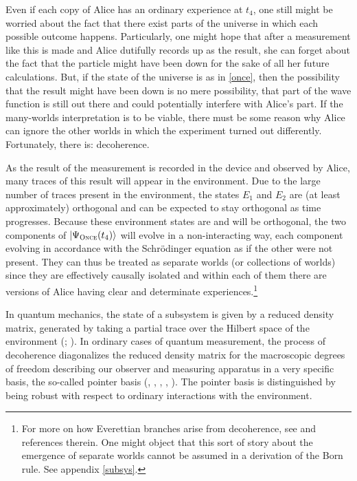 \documentclass[onecolumn,secnumarabic,amsmath,amssymb,balancelastpage,nofootinbib]{article}
\newcommand{\ket}[1]{\ensuremath{\left|#1\right\rangle}}
\begin{document}
Even if each copy of Alice has an ordinary experience at $t_4$, one still might be worried about the fact that there exist parts of the universe in which each possible outcome happens.  Particularly, one might hope that after a measurement like this is made and Alice dutifully records up as the result, she can forget about the fact that the particle might have been down for the sake of all her future calculations.  But, if the state of the universe is as in \eqref{once}, then the possibility that the result might have been down is no mere possibility, that part of the wave function is still out there and could potentially interfere with Alice's part.  If the many-worlds interpretation is to be viable, there must be some reason why Alice can ignore the other worlds in which the experiment turned out differently.  Fortunately, there is: decoherence.

As the result of the measurement is recorded in the device and observed by Alice, many traces of this result will appear in the environment.  Due to the large number of traces present in the environment, the states $E_1$ and $E_2$ are (at least approximately) orthogonal and can be expected to stay orthogonal as time progresses.  Because these environment states are and will be orthogonal, the two components of $\ket{\Psi_{\textsc{Once}}(t_4)}$ will evolve in a non-interacting way, each component evolving in accordance with the Schr\"{o}dinger equation as if the other were not present.  They can thus be treated as separate worlds (or collections of worlds) since they are effectively causally isolated and within each of them there are versions of Alice having clear and determinate experiences.\footnote{For more on how Everettian branches arise from decoherence, see \citep[][]{schlosshauer2005decoherence, saunders2010} and references therein.  One might object that this sort of story about the emergence of separate worlds cannot be assumed in a derivation of the Born rule.  See appendix \ref{subsys}.}

In quantum mechanics, the state of a subsystem is given by a reduced density matrix, generated by taking a partial trace over the Hilbert space of the environment (\citealp[]{schlosshauer}; \citealp[]{nielsen2010}). In ordinary cases of quantum measurement, the process of decoherence diagonalizes the reduced density matrix for the macroscopic degrees of freedom describing our observer and measuring apparatus in a very specific basis, the so-called pointer basis (\citeauthor{Zurek:1981xq}, \citeyear{Zurek:1981xq}, \citeyear{Zurek:1982ii}, \citeyear{Zurek:1993ptp}, \citeyear{zurek2003}). The pointer basis is distinguished by being robust with respect to ordinary interactions with the environment.
\end{document}
